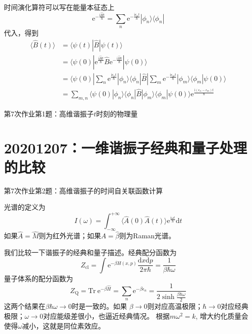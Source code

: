         时间演化算符可以写在能量本征态上
        \[ \mathrm{e}^{-\frac {\mathrm{i}\hat{H}t}{\hbar}} = \sum_n \mathrm{e}^{-\frac {\mathrm{i}\epsilon_n t}{\hbar}} |\phi_n \rangle \langle\phi_n| \]
        代入，得到 
        \begin{align*}
            \langle \hat{B}(t) \rangle &= \langle \psi(t)|\hat{B} | \psi(t) \rangle\\
            &= \langle \psi(0) |\mathrm{e}^{\frac {\mathrm{i}\hat{H}t}{\hbar}} \hat{B} \mathrm{e}^{-\frac {\mathrm{i}\hat{H}t}{\hbar}}|\psi(0) \rangle\\
            &= \langle \psi(0) |\sum_n \mathrm{e}^{\frac {\mathrm{i}\epsilon_n t}{\hbar}} |\phi_n \rangle \langle\phi_n|\hat{B}|\sum_m \mathrm{e}^{-\frac {\mathrm{i}\epsilon_m t}{\hbar}} |\phi_m \rangle \langle\phi_m|\psi(0)\rangle\\
            &= \sum_{m,n} \langle \psi(0)|\phi_n\rangle \langle \phi_n|\hat{B}|\phi_m \rangle \langle \phi_m|\psi(0)\rangle \mathrm{e}^{\frac {\mathrm{i}(\epsilon_n-\epsilon_m)t}{\hbar}}
        \end{align*}
        \begin{asg}
            第7次作业第1题：高维谐振子$t$时刻的物理量
        \end{asg}

    \section{20201207：一维谐振子经典和量子处理的比较}
    \begin{asg}
        第7次作业第2题：高维谐振子的时间自关联函数计算
    \end{asg}

    光谱的定义为
    \[ I(\omega) = \int_{-\infty}^{+\infty} \langle \hat{A}(0)\hat{A}(t)\rangle \mathrm{e}^{\frac {\mathrm{i}\omega t}{\hbar}} \mathrm{d}t \]
    如果$\hat{A} = \hat{M}$则为红外光谱；如果$\hat{A} = \hat{\beta}$则为Raman光谱。

    我们比较一下谐振子的经典和量子描述。经典配分函数为
    \[ Z_\mathrm{cl} = \int \mathrm{e}^{-\beta H(x,p)}\frac {\mathrm{d}x\mathrm{d}p}{2\pi\hbar} = \frac 1{\beta\hbar\omega} \]
    量子体系的配分函数为
    \[ Z_\mathrm{Q} = \mathrm{Tr} \ \mathrm{e}^{-\beta \hat{H}} = \sum_n \mathrm{e}^{-\beta\epsilon_n} = \frac 1{2\sinh{\frac {\beta\hbar\omega}2}} \]
    这两个结果在$\beta\hbar\omega \to 0$时是一致的。如果
    $\beta \to 0$则对应高温极限；$\hbar \to 0$对应经典极限；$\omega \to 0$对应能级差很小，也逼近经典情况。
    根据$m\omega^2 = k$, 增大约化质量会使得$\omega$减小，这就是同位素效应。

